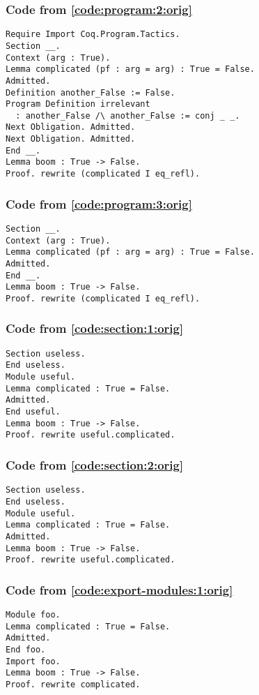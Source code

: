 \documentclass[a4paper,USenglish,cleveref,autoref,thm-restate]{lipics-v2021}
\begin{document}
\subsubsection{Code from \autoref{code:program:2:orig}}\label{code:program:2}
\begin{verbatim}
Require Import Coq.Program.Tactics.
Section __.
Context (arg : True).
Lemma complicated (pf : arg = arg) : True = False.
Admitted.
Definition another_False := False.
Program Definition irrelevant
  : another_False /\ another_False := conj _ _.
Next Obligation. Admitted.
Next Obligation. Admitted.
End __.
Lemma boom : True -> False.
Proof. rewrite (complicated I eq_refl).
\end{verbatim}

\subsubsection{Code from \autoref{code:program:3:orig}}\label{code:program:3}
\begin{verbatim}
Section __.
Context (arg : True).
Lemma complicated (pf : arg = arg) : True = False.
Admitted.
End __.
Lemma boom : True -> False.
Proof. rewrite (complicated I eq_refl).
\end{verbatim}

\subsubsection{Code from \autoref{code:section:1:orig}}\label{code:section:1}
\begin{verbatim}
Section useless.
End useless.
Module useful.
Lemma complicated : True = False.
Admitted.
End useful.
Lemma boom : True -> False.
Proof. rewrite useful.complicated.
\end{verbatim}

\subsubsection{Code from \autoref{code:section:2:orig}}\label{code:section:2}
\begin{verbatim}
Section useless.
End useless.
Module useful.
Lemma complicated : True = False.
Admitted.
Lemma boom : True -> False.
Proof. rewrite useful.complicated.
\end{verbatim}

\subsubsection{Code from \autoref{code:export-modules:1:orig}}\label{code:export-modules:1}
\begin{verbatim}
Module foo.
Lemma complicated : True = False.
Admitted.
End foo.
Import foo.
Lemma boom : True -> False.
Proof. rewrite complicated.
\end{verbatim}
\end{document}
